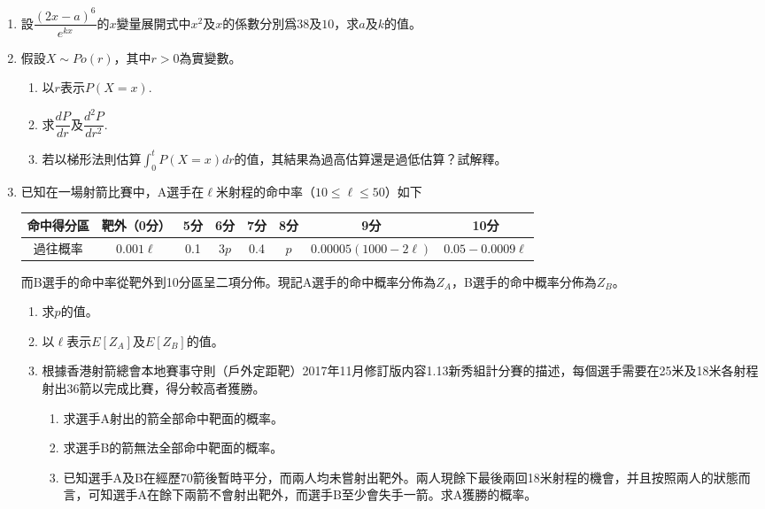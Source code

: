 \documentclass[12pt]{article}
\begin{document}
    \begin{enumerate}
        \item 設$\dfrac{(2x-a)^6}{e^{kx}}$的$x$變量展開式中$x^2$及$x$的係數分別爲$38$及$10$，求$a$及$k$的值。
        \item 假設$X\sim Po(r)$，其中$r>0$為實變數。\begin{enumerate}
            \item 以$r$表示$P(X=x)$.
            \item 求$\dfrac{dP}{dr}$及$\dfrac{d^2P}{dr^2}$.
            \item 若以梯形法則估算$\int_{0}^{t}P(X=x) dr$的值，其結果為過高估算還是過低估算？試解釋。
        \end{enumerate}
        \item 已知在一場射箭比賽中，A選手在$\ell$米射程的命中率（$10\leq \ell \leq 50$）如下\begin{center}
            \begin{tabular}{|c||c|c|c|c|c|c|c|}
                \hline
                命中得分區&靶外（0分）&5分&6分&7分&8分&9分&10分\\
                \hline
                過往概率&$0.001\ell$&0.1&$3p$&0.4&$p$&$0.00005(1000-2\ell)$&$0.05-0.0009\ell$\\
                \hline
            \end{tabular}
        \end{center}
        而B選手的命中率從靶外到10分區呈二項分佈。現記A選手的命中概率分佈為$Z_A$，B選手的命中概率分佈為$Z_B$。\begin{enumerate}
            \item 求$p$的值。
            \item 以$\ell$表示$E[Z_A]$及$E[Z_B]$的值。
            \item 根據香港射箭總會本地賽事守則（戶外定距靶）2017年11月修訂版内容1.13新秀組計分賽的描述，每個選手需要在25米及18米各射程射出36箭以完成比賽，得分較高者獲勝。\begin{enumerate}
                \item 求選手A射出的箭全部命中靶面的概率。
                \item 求選手B的箭無法全部命中靶面的概率。
                \item 已知選手A及B在經歷70箭後暫時平分，而兩人均未嘗射出靶外。兩人現餘下最後兩回18米射程的機會，并且按照兩人的狀態而言，可知選手A在餘下兩箭不會射出靶外，而選手B至少會失手一箭。求A獲勝的概率。
            \end{enumerate}
        \end{enumerate}

\end{enumerate}
\end{document}
